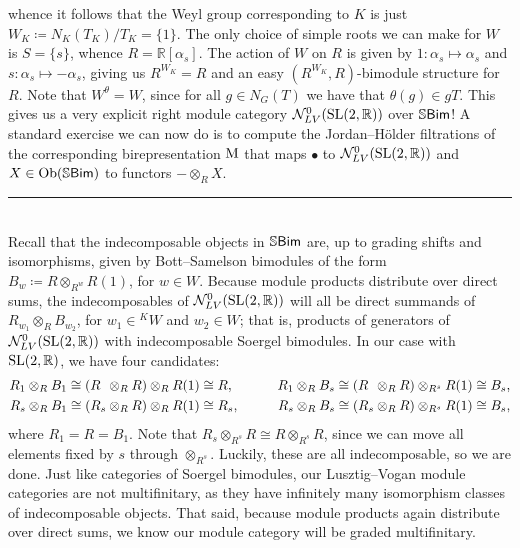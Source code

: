 \begin{example}
whence it follows that the Weyl group corresponding to $K$ is just $W_K \coloneqq N_K(T_K)/T_K = \{1\}$. The only choice of simple roots we can make for $W$ is $S = \{s\}$, whence $R = \mathbb{R}[\alpha_{s}]$. The action of $W$ on $R$ is given by $1 : \alpha_s \mapsto \alpha_s$ and $s : \alpha_s \mapsto -\alpha_s$, giving us $R^{W_K} = R$ and an easy $(R^{W_K}, R)$-bimodule structure for $R$. Note that $W^\theta = W$, since for all $g \in N_G(T)$ we have that $\theta(g) \in gT$. This gives us a very explicit right module category $\mathcal{N}_{LV}^0(\textup{SL}(2, \mathbb{R}))$ over $\mathbb{S}\textup{\textsf{Bim}}$! A standard exercise we can now do is to compute the Jordan--H\"{o}lder filtrations of the corresponding birepresentation $\textup{M}$ that maps $\bullet$ to $\mathcal{N}_{LV}^0(\textup{SL}(2, \mathbb{R}))$ and $X \in \textup{Ob}(\mathbb{S}\textup{\textsf{Bim}})$ to functors $- \otimes_R X$.\\[-1.5\baselineskip]%
\begin{center}
\rule{0.5\linewidth}{1pt}
\end{center}
\noindent\\[-\baselineskip]
\noindent Recall that the indecomposable objects in $\mathbb{S}\textup{\textsf{Bim}}$ are, up to grading shifts and isomorphisms, given by Bott--Samelson bimodules of the form $B_w \coloneqq R \otimes_{R^w} R(1)$, for $w \in W$. Because module products distribute over direct sums, the indecomposables of $\mathcal{N}_{LV}^0(\textup{SL}(2, \mathbb{R}))$ will all be direct summands of $R_{w_1} \otimes_R B_{w_2}$, for $w_1 \in {}^KW$ and $w_2 \in W$; that is, products of generators of $\mathcal{N}_{LV}^0(\textup{SL}(2, \mathbb{R}))$ with indecomposable Soergel bimodules. In our case with $\textup{SL}(2, \mathbb{R})$, we have four candidates:
\begin{alignat*}{2}
R_1 \otimes_R B_1 \cong (R\hphantom{{}_{s}} \otimes_R R) \otimes_R R(1) &\cong R,&\qquad R_1 \otimes_R B_{s} \cong (R\hphantom{{}_{s}} \otimes_R R) \otimes_{R^{s}} R(1) &\cong B_{s},\\
R_{s} \otimes_R B_1 \cong (R_{s} \otimes_R R) \otimes_R R(1) &\cong R_{s},&\qquad R_{s} \otimes_R B_{s} \cong (R_{s} \otimes_R R) \otimes_{R^{s}} R(1) &\cong B_{s},
\end{alignat*}
\noindent where $R_1 = R = B_1$. Note that $R_s \otimes_{R^s} R \cong R \otimes_{R^s} R$, since we can move all elements fixed by $s$ through $\otimes_{R^s}$. Luckily, these are all indecomposable, so we are done. Just like categories of Soergel bimodules, our Lusztig--Vogan module categories are not multifinitary, as they have infinitely many isomorphism classes of indecomposable objects. That said, because module products again distribute over direct sums, we know our module category will be graded multifinitary.\newpage %


\end{example}

